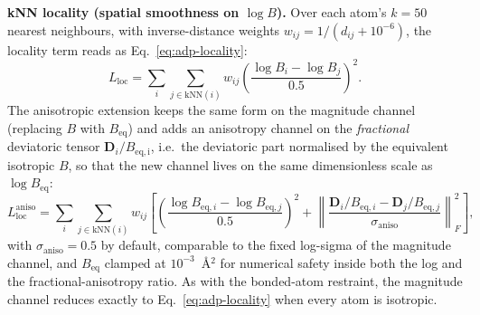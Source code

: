 \documentclass{iucrjournals}
\begin{document}
\textbf{kNN locality (spatial smoothness on $\log B$).} Over each atom's $k = 50$
nearest neighbours, with inverse-distance weights
$w_{ij} = 1/(d_{ij} + 10^{-6})$, the locality term reads as
Eq.~\ref{eq:adp-locality}:
%
\begin{equation}
  L_\mathrm{loc} = \sum_{i}\sum_{j \in \mathrm{kNN}(i)} w_{ij}
  \left(\frac{\log B_{i} - \log B_{j}}{0.5}\right)^{2}.
  \label{eq:adp-locality}
\end{equation}
The anisotropic extension keeps the same form on the magnitude channel
(replacing $B$ with $B_\mathrm{eq}$) and adds an anisotropy channel on the
\emph{fractional} deviatoric tensor $\mathbf{D}_{i}/B_\mathrm{eq,i}$, i.e.\ the
deviatoric part normalised by the equivalent isotropic $B$, so that the new
channel lives on the same dimensionless scale as $\log B_\mathrm{eq}$:
%
\begin{equation}
  L_\mathrm{loc}^{\mathrm{aniso}} = \sum_{i}\sum_{j \in \mathrm{kNN}(i)}
  w_{ij}\left[
  \left(\frac{\log B_{\mathrm{eq},i} - \log B_{\mathrm{eq},j}}{0.5}\right)^{2}
  + \left\lVert
    \frac{\mathbf{D}_{i}/B_{\mathrm{eq},i} - \mathbf{D}_{j}/B_{\mathrm{eq},j}}
         {\sigma_\mathrm{aniso}}
  \right\rVert_{F}^{2}
  \right],
  \label{eq:adp-locality-aniso}
\end{equation}
with $\sigma_\mathrm{aniso} = 0.5$ by default, comparable to the fixed
log-sigma of the magnitude channel, and $B_\mathrm{eq}$ clamped at
$10^{-3}$~\AA$^{2}$ for numerical safety inside both the log and the
fractional-anisotropy ratio. As with the bonded-atom restraint, the
magnitude channel reduces exactly to Eq.~\ref{eq:adp-locality} when every atom
is isotropic.
\end{document}

